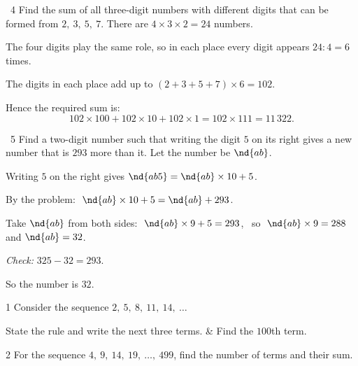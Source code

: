 \gap
\begin{exbox}{\ExWord\ 4}
Find the sum of all three-digit numbers with different digits that can be formed from $2,\ 3,\ 5,\ 7$.
\guide
There are $4\times3\times2=24$ numbers.\par The four digits play the same role, so in each place every digit appears $24:4=6$ times.\par
The digits in each place add up to $(2+3+5+7)\times6=102$.\par Hence the required sum is:
\[102\times100+102\times10+102\times1=102\times111=11\,322.\]
\end{exbox}
\gap
\begin{exbox}{\ExWord\ 5}
Find a two-digit number such that writing the digit $5$ on its right gives a new number that is $293$ more than it.
\guide
Let the number be $\nd{ab}$.\par Writing $5$ on the right gives $\nd{ab5}=\nd{ab}\times10+5$.\par
By the problem: $\ \nd{ab}\times10+5=\nd{ab}+293$.\par
Take $\nd{ab}$ from both sides: $\ \nd{ab}\times9+5=293$, \ so $\ \nd{ab}\times9=288$ and $\nd{ab}=32$.\par
\emph{Check:} $325-32=293$.\par So the number is $32$.
\end{exbox}
\begin{probbox}{1}{\relax}
Consider the sequence $2,\ 5,\ 8,\ 11,\ 14,\ \dots$
\begin{cols2}
 State the rule and write the next three terms. &  Find the $100$th term.\\
\end{cols2}
\end{probbox}
\gap
\begin{probbox}{2}{\relax}
For the sequence $4,\ 9,\ 14,\ 19,\ \dots,\ 499$, find the number of terms and their sum.
\end{probbox}
